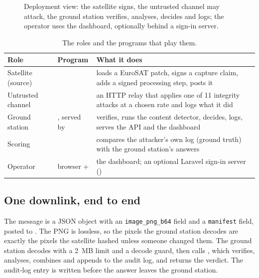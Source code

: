 \begin{figure}[!htbp]
\begin{adjustbox}{max width=\textwidth}
\end{adjustbox}
\caption{Deployment view: the satellite signs, the untrusted channel may attack, the ground station verifies, analyses, decides and logs; the operator uses the dashboard, optionally behind a sign-in server.}
\end{figure}

\begin{table}[!htbp]
\centering\small
\begin{tabularx}{\textwidth}{|L{2.4cm}|L{5.4cm}|Y|}
\hline
\textbf{Role} & \textbf{Program} & \textbf{What it does}\\
\hline
Satellite (source) &  & loads a EuroSAT patch, signs a capture claim, adds a signed processing step, posts it\\
\hline
Untrusted channel &  & an HTTP relay that applies one of 11 integrity attacks at a chosen rate and logs what it did\\
\hline
Ground station & , served by  & verifies, runs the content detector, decides, logs, serves the API and the dashboard\\
\hline
Scoring &  & compares the attacker's own log (ground truth) with the ground station's answers\\
\hline
Operator & browser +  & the dashboard; an optional Laravel sign-in server ()\\
\hline
\end{tabularx}
\caption{The roles and the programs that play them.}
\end{table}

\subsection{One downlink, end to end}
The message is a JSON object with an \texttt{image\_png\_b64} field and a \texttt{manifest} field, posted to . The PNG is lossless, so the pixels the ground station decodes are exactly the pixels the satellite hashed unless someone changed them. The ground station decodes with a 2~MB limit and a decode guard, then calls , which verifies, analyses, combines and appends to the audit log, and returns the verdict. The audit-log entry is written before the answer leaves the ground station.

